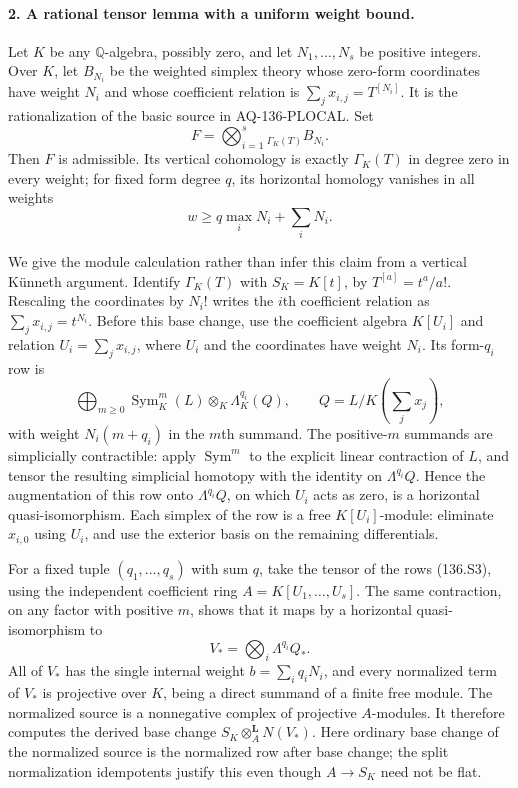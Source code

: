 \paragraph{2. A rational tensor lemma with a uniform weight bound.}
Let $K$ be any $\mathbb Q$-algebra, possibly zero, and let
$N_1,\ldots,N_s$ be positive integers. Over $K$, let $B_{N_i}$
be the weighted simplex theory whose zero-form coordinates
have weight $N_i$ and whose coefficient relation is
$\sum_jx_{i,j}=T^{[N_i]}$. It is the rationalization of
the basic source in AQ-136-PLOCAL. Set
\[
 F=\bigotimes_{i=1}^s{}_{\Gamma_K(T)}B_{N_i}.
\]
Then $F$ is admissible. Its vertical cohomology is exactly
$\Gamma_K(T)$ in degree zero in every weight; for fixed
form degree $q$, its horizontal homology vanishes in all
weights
\[
                    w\ge q\max_iN_i+\sum_iN_i.           \tag{136.S2}
\]

We give the module calculation rather than infer this claim
from a vertical K\"unneth argument. Identify
$\Gamma_K(T)$ with $S_K=K[t]$, by $T^{[a]}=t^a/a!$.
Rescaling the coordinates by $N_i!$ writes the $i$th
coefficient relation as $\sum_jx_{i,j}=t^{N_i}$.
Before this base change, use the coefficient algebra
$K[U_i]$ and relation $U_i=\sum_jx_{i,j}$, where $U_i$
and the coordinates have weight $N_i$. Its form-$q_i$
row is
\[
 \bigoplus_{m\ge0}\operatorname{Sym}^m_K(L)
                         \otimes_K\Lambda^{q_i}_K(Q),
 \qquad Q=L/K\!\left(\sum_jx_j\right),                 \tag{136.S3}
\]
with weight $N_i(m+q_i)$ in the $m$th summand.
The positive-$m$ summands are simplicially contractible:
apply $\operatorname{Sym}^m$ to the explicit linear
contraction of $L$, and tensor the resulting simplicial
homotopy with the identity on $\Lambda^{q_i}Q$.
Hence the augmentation of this row onto
$\Lambda^{q_i}Q$, on which $U_i$ acts as zero, is a
horizontal quasi-isomorphism. Each simplex of the row
is a free $K[U_i]$-module: eliminate $x_{i,0}$ using
$U_i$, and use the exterior basis on the remaining
differentials.

For a fixed tuple $(q_1,\ldots,q_s)$ with sum $q$, take
the tensor of the rows (136.S3), using the independent
coefficient ring $A=K[U_1,\ldots,U_s]$.
The same contraction, on any factor with positive $m$,
shows that it maps by a horizontal quasi-isomorphism to
\[
                V_* =\bigotimes_i\Lambda^{q_i}Q_*.
\]
All of $V_*$ has the single internal weight
$b=\sum_iq_iN_i$, and every normalized term of $V_*$
is projective over $K$, being a direct summand of a
finite free module. The normalized source is a
nonnegative complex of projective $A$-modules. It
therefore computes the derived base change
$S_K\otimes_A^{\mathbf L}N(V_*)$.
Here ordinary base change of the normalized source is
the normalized row after base change; the split
normalization idempotents justify this even though
$A\to S_K$ need not be flat.

